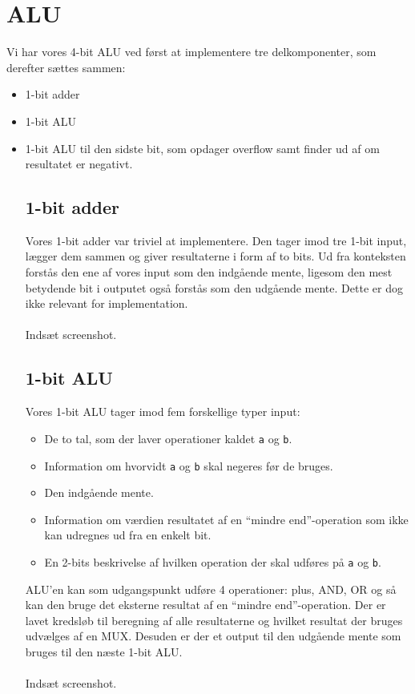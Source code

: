\section{ALU}
Vi har vores 4-bit ALU ved først at implementere tre delkomponenter, som
derefter sættes sammen:
\begin{itemize}
\item 1-bit adder
\item 1-bit ALU
\item 1-bit ALU til den sidste bit, som opdager overflow samt finder ud af om
resultatet er negativt.
\begin{itemize}

\subsection{1-bit adder}
Vores 1-bit adder var triviel at implementere. Den tager imod tre 1-bit input, lægger
dem sammen og giver resultaterne i form af to bits. Ud fra konteksten forstås
den ene af vores input som den indgående mente, ligesom den mest betydende bit i outputet
også forstås som den udgående mente. Dette er dog ikke relevant for
implementation. \\
\\
Indsæt screenshot.

\subsection{1-bit ALU}
Vores 1-bit ALU tager imod fem forskellige typer input:
\begin{itemize}
\item De to tal, som der laver operationer kaldet {\tt a} og {\tt b}.
\item Information om hvorvidt {\tt a} og {\tt b} skal negeres før de bruges.
\item Den indgående mente.
\item Information om værdien resultatet af en ``mindre end''-operation som ikke
kan udregnes ud fra en enkelt bit.
\item En 2-bits beskrivelse af hvilken operation der skal udføres på {\tt a} og
{\tt b}.
\end{itemize}

ALU'en kan som udgangspunkt udføre 4 operationer: plus, AND, OR og så kan den
bruge det eksterne resultat af en ``mindre end''-operation. Der er lavet
kredsløb til beregning af alle resultaterne og hvilket resultat der bruges
udvælges af en MUX. Desuden er der et output til den udgående mente som bruges
til den næste 1-bit ALU. \\
\\
Indsæt screenshot.


\end{itemize}
\end{itemize}
